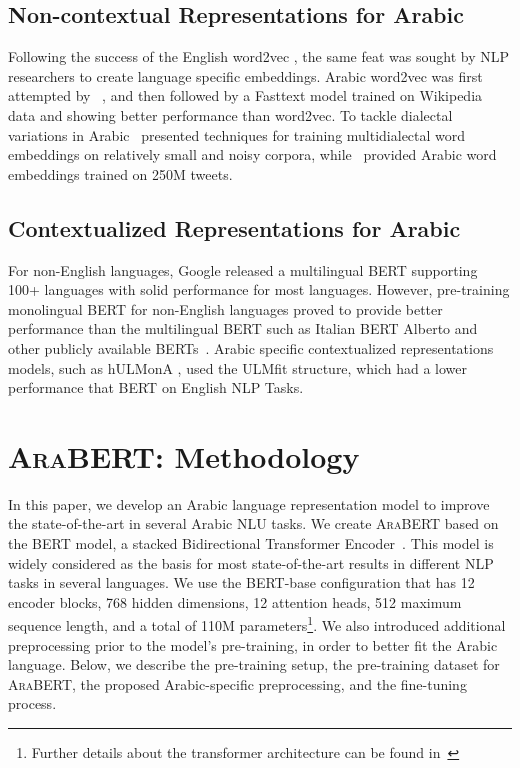 \documentclass[10pt, a4paper]{article}
\begin{document}
\subsection{Non-contextual Representations for Arabic}
Following the success of the English word2vec \cite{mikolov2013distributed}, the same feat was sought by NLP researchers to create language specific embeddings. Arabic word2vec was first attempted by ~\cite{soliman2017aravec}, and then followed by a Fasttext model \cite{bojanowski2017enriching} trained on Wikipedia data and showing better performance than word2vec. To tackle dialectal variations in Arabic~\cite{erdmann2018addressing} presented techniques for training multidialectal word embeddings on relatively small and noisy corpora, while~\cite{abu-farha-magdy-2019-mazajak,abdul2018you} provided Arabic word embeddings trained on 250M tweets.

\subsection{Contextualized Representations for Arabic}
For non-English languages, Google released a multilingual BERT \cite{devlin2018bert} supporting 100+ languages with solid performance for most languages.
However, pre-training monolingual BERT for non-English languages proved to provide better performance than the multilingual BERT such as Italian BERT Alberto \cite{polignano2019alberto} and other publicly available BERTs~\cite{martin2019camembert,de2019bertje}. Arabic specific contextualized representations models, such as hULMonA \cite{eljundi2019hulmona}, used the ULMfit structure, which had a lower performance that BERT on English NLP Tasks. \section{\textsc{AraBERT}: Methodology}
\label{sec:methodology}

In this paper, we develop an Arabic language representation model to improve the state-of-the-art in several Arabic NLU tasks. We create \textsc{AraBERT} based on the BERT model, a stacked Bidirectional Transformer Encoder~\cite{devlin2018bert}.  This model is widely considered as the basis for most state-of-the-art results in different NLP tasks in several languages. We use the BERT-base configuration that has 12 encoder blocks, 768 hidden dimensions, 12 attention heads, 512 maximum sequence length, and a total of 110M parameters\footnote{Further details about the transformer architecture can be found in~\cite{vaswani2017attention}}. We also introduced additional preprocessing prior to the model's pre-training, in order to better fit the Arabic language.  Below, we describe the pre-training setup, the pre-training dataset for \textsc{AraBERT}, the proposed Arabic-specific preprocessing, and the fine-tuning process.
\end{document}

